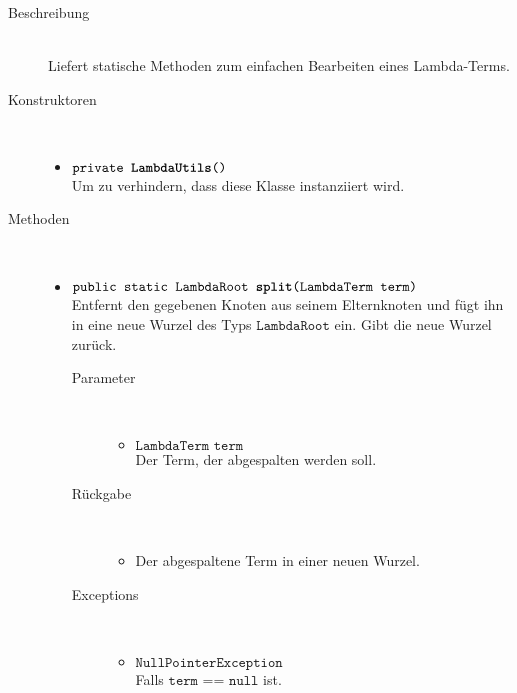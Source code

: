\begin{description}
\item[Beschreibung] \hfill \\ Liefert statische Methoden zum einfachen Bearbeiten eines Lambda-Terms.

\item[Konstruktoren] \hfill \\
	\vspace{-.8cm}
	\begin{itemize}
		\item $\texttt{private \textbf{LambdaUtils}()}$ \\ Um zu verhindern, dass diese Klasse instanziiert wird.
	\end{itemize}
	
\item[Methoden] \hfill \\
	\vspace{-.8cm}
	\begin{itemize}
		\item $\texttt{public static LambdaRoot \textbf{split}(LambdaTerm term)}$ \\ Entfernt den gegebenen Knoten aus seinem Elternknoten und fügt ihn in eine neue Wurzel des Typs $\texttt{LambdaRoot}$ ein. Gibt die neue Wurzel zurück.
		\begin{description}
			\item[Parameter] \hfill \\
			\vspace{-.8cm}
			\begin{itemize}
				\item $\texttt{LambdaTerm term}$ \\ Der Term, der abgespalten werden soll.
			\end{itemize}
			\item[Rückgabe] \hfill \\
			\vspace{-.8cm}
			\begin{itemize}
				\item Der abgespaltene Term in einer neuen Wurzel.
			\end{itemize}
			\item[Exceptions] \hfill \\
			\vspace{-.8cm}
			\begin{itemize}
				\item $\texttt{NullPointerException}$ \\ Falls $\texttt{term == null}$ ist.
			\end{itemize}
		\end{description}
	\end{itemize}
\end{description}

